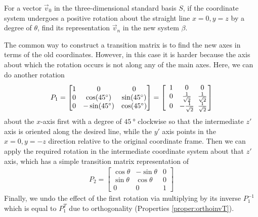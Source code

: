 \begin{exmp}
For a vector $\vec{v}_0$ in the three-dimensional standard basis $S$, if the coordinate system undergoes a positive rotation about the straight line $x = 0, y = z$ by a degree of $\theta$, find its representation $\vec{v}_n$ in the new system $\beta$.
\end{exmp}
\begin{solution}
The common way to construct a transition matrix is to find the new axes in terms of the old coordinates. However, in this case it is harder because the axis about which the rotation occurs is not along any of the main axes. Here, we can do another rotation 
\begin{align*}
P_1 = 
\begin{bmatrix}
1 & 0 & 0 \\
0 & \cos(\SI{45}{\degree}) & \sin(\SI{45}{\degree}) \\
0 & -\sin(\SI{45}{\degree}) & \cos(\SI{45}{\degree})
\end{bmatrix}
=
\left[\begin{array}{@{\,}wc{12pt}wc{12pt}wc{12pt}@{\,}}
1 & 0 & 0 \\
0 & \frac{1}{\sqrt{2}} & \frac{1}{\sqrt{2}} \\
0 & -\frac{1}{\sqrt{2}} & \frac{1}{\sqrt{2}}
\end{array}\right]
\end{align*}
about the $x$-axis first with a degree of $\SI{45}{\degree}$ clockwise so that the intermediate $z'$ axis is oriented along the desired line, while the $y'$ axis points in the $x = 0, y = -z$ direction relative to the original coordinate frame. Then we can apply the required rotation in the intermediate coordinate system about that $z'$ axis, which has a simple transition matrix representation of
\begin{align*}
P_2 =
\begin{bmatrix}
\cos \theta & -\sin \theta & 0 \\
\sin \theta & \cos \theta & 0 \\
0 & 0 & 1
\end{bmatrix}
\end{align*}
Finally, we undo the effect of the first rotation via multiplying by its inverse $P_1^{-1}$ which is equal to $P_1^T$ due to orthogonality (Properties \ref{proper:orthoinvT}). 
\begin{center}
\end{center}
\end{solution}
